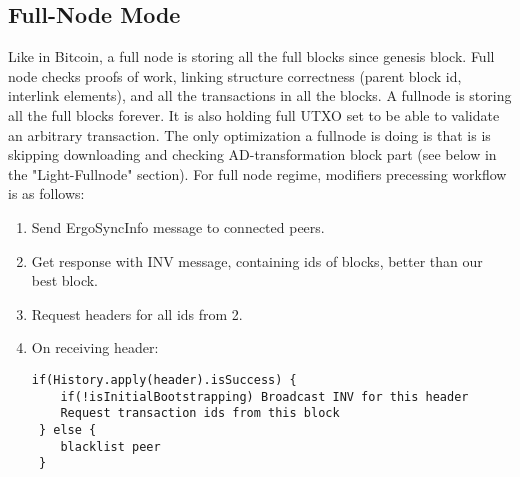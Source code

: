 \documentclass[]{report}   %
\begin{document}
\subsection{Full-Node Mode}
Like in Bitcoin, a full node is storing all the full blocks since genesis block. Full node checks proofs of work, linking structure correctness (parent block id, interlink elements), and all the transactions in all the blocks. A fullnode is storing all the full blocks forever. It is also holding full UTXO set to be able to validate an arbitrary transaction.
The only optimization a fullnode is doing is that is is skipping downloading and checking AD-transformation block part (see below in the "Light-Fullnode" section).
For full node regime, modifiers precessing workflow is as follows:
\begin{enumerate}
   \item Send ErgoSyncInfo message to connected peers.
   \item Get response with INV message, containing ids of blocks, better than our best block.
   \item Request headers for all ids from 2.
   \item On receiving header:
   \begin{verbatim}
if(History.apply(header).isSuccess) {
    if(!isInitialBootstrapping) Broadcast INV for this header   
    Request transaction ids from this block
 } else {
    blacklist peer
 }
\end{verbatim} 
\vspace{1em}
   

\end{enumerate}
\end{document}
